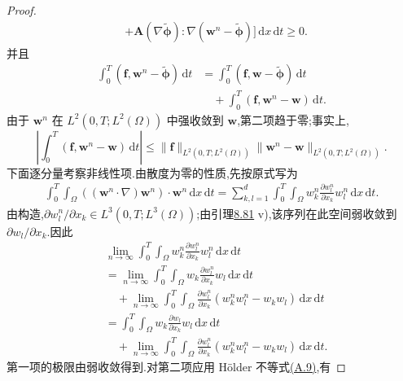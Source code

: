 \begin{lemma}[两个试验函数的弱方程之差的估计]
\begin{proof}
\begin{equation}
\begin{aligned}
 &+\bm{A}(\nabla\widetilde{\symbf{\phi}})
       :\nabla(\bm{w}^n-\widetilde{\symbf{\phi}})\Bigr]
                       \,\mathrm{d}x\,\mathrm{d}t\ge0.
\end{aligned}
\end{equation}
并且
\[
\begin{aligned}
 \int_0^T(\bm{f},\bm{w}^n-\widetilde{\symbf{\phi}})\,\mathrm{d}t
 &=\int_0^T(\bm{f},\bm{w}-\widetilde{\symbf{\phi}})\,\mathrm{d}t\\
 &\quad+\int_0^T(\bm{f},\bm{w}^n-\bm{w})\,\mathrm{d}t.
\end{aligned}
\]
由于 $\bm{w}^n$ 在 $L^2(0,T;L^2(\Omega))$ 中强收敛到 $\bm{w}$,第二项趋于零;事实上,
\[
 \left|\int_0^T(\bm{f},\bm{w}^n-\bm{w})\,\mathrm{d}t\right|
 \le \|\bm{f}\|_{L^2(0,T;L^2(\Omega))}
       \|\bm{w}^n-\bm{w}\|_{L^2(0,T;L^2(\Omega))}.
\]
下面逐分量考察非线性项.由散度为零的性质,先按原式写为
\[
\begin{aligned}
 \int_0^T\int_\Omega
       ((\bm{w}^n\cdot\nabla)\bm{w}^n)\cdot\bm{w}^n
                                  \,\mathrm{d}x\,\mathrm{d}t
 =\sum_{k,l=1}^{d}\int_0^T\int_\Omega
       w_k^n\frac{\partial w_l^n}{\partial x_k}w_l^n
                                  \,\mathrm{d}x\,\mathrm{d}t.
\end{aligned}
\]
由构造,$\partial w_l^n/\partial x_k\in L^3(0,T;L^3(\Omega))$;由引理\hyperref[lem:smagorinsky-convergent-subsequence]{8.81} v),该序列在此空间弱收敛到 $\partial w_l/\partial x_k$.因此
\[
\begin{aligned}
 &\lim_{n\to\infty}\int_0^T\int_\Omega
       w_k^n\frac{\partial w_l^n}{\partial x_k}w_l^n
                                  \,\mathrm{d}x\,\mathrm{d}t\\
 &=\lim_{n\to\infty}\int_0^T\int_\Omega
       w_k\frac{\partial w_l^n}{\partial x_k}w_l
                                  \,\mathrm{d}x\,\mathrm{d}t\\
 &\quad+\lim_{n\to\infty}\int_0^T\int_\Omega
       \frac{\partial w_l^n}{\partial x_k}
          (w_k^nw_l^n-w_kw_l)
                                  \,\mathrm{d}x\,\mathrm{d}t\\
 &=\int_0^T\int_\Omega
       w_k\frac{\partial w_l}{\partial x_k}w_l
                                  \,\mathrm{d}x\,\mathrm{d}t\\
 &\quad+\lim_{n\to\infty}\int_0^T\int_\Omega
       \frac{\partial w_l^n}{\partial x_k}
          (w_k^nw_l^n-w_kw_l)
                                  \,\mathrm{d}x\,\mathrm{d}t.
\end{aligned}
\]
第一项的极限由弱收敛得到.对第二项应用 Hölder 不等式\hyperref[eq:appendix-a-9]{(A.9)},有

\end{proof}
\end{lemma}
